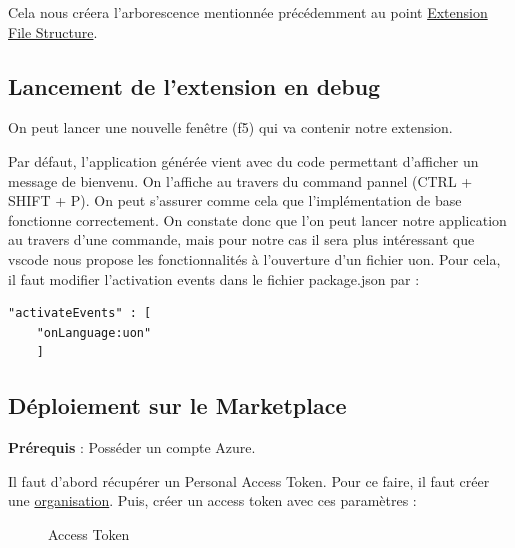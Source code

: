 \documentclass[
    iict, %
    il, %
]{heig-tb}
\begin{document}
Cela nous créera l'arborescence mentionnée précédemment au point \hyperref[Extension File Structure]{Extension File Structure}.

\subsection{Lancement de l'extension en debug}
On peut lancer une nouvelle fenêtre (f5) qui va contenir notre extension.

Par défaut, l'application générée vient avec du code permettant d'afficher un message de bienvenu. On l'affiche au travers du command pannel (CTRL + SHIFT + P). On peut s'assurer comme cela que l'implémentation de base fonctionne correctement.
On constate donc que l'on peut lancer notre application au travers d'une commande, mais pour notre cas il sera plus intéressant que vscode nous propose les fonctionnalités à l'ouverture d'un fichier uon.
Pour cela, il faut modifier l'activation events dans le fichier package.json par :
\begin{lstlisting}[frame=single]
    "activateEvents" : [
	"onLanguage:uon"
    ]
\end{lstlisting}

\subsection{Déploiement sur le Marketplace}

\textbf{Prérequis} : Posséder un compte Azure.

Il faut d'abord récupérer un Personal Access Token. Pour ce faire, il faut créer une \href{https://docs.microsoft.com/en-us/azure/devops/organizations/accounts/create-organization?view=azure-devops}{organisation}.
Puis, créer un access token avec ces paramètres :
\begin{figure}[!h]
    \begin{center}
    \end{center}
    \caption[Access Token]{\label{access-token}Access Token}
\end{figure}
\end{document}
